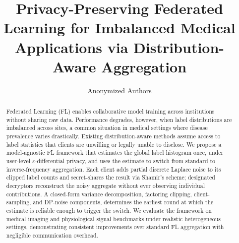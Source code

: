 \documentclass[runningheads]{llncs}
\begin{document}
%
\title{Privacy-Preserving Federated Learning for Imbalanced Medical Applications via Distribution-Aware Aggregation}
%

\author{Anonymized Authors}  %

\maketitle              %
%
\begin{abstract}
Federated Learning (FL) enables collaborative model training across institutions without sharing raw data.
Performance degrades, however, when label distributions are imbalanced across sites, a common situation in medical settings where disease prevalence varies drastically.
Existing distribution-aware methods assume access to label statistics that clients are unwilling or legally unable to disclose.
We propose a model-agnostic FL framework that estimates the global label histogram once, under user-level $\varepsilon$-differential privacy, and uses the estimate to switch from standard to inverse-frequency aggregation.
Each client adds partial discrete Laplace noise to its clipped label counts and secret-shares the result via Shamir's scheme; designated decryptors reconstruct the noisy aggregate without ever observing individual contributions.
A closed-form variance decomposition, factoring clipping, client-sampling, and DP-noise components, determines the earliest round at which the estimate is reliable enough to trigger the switch.
We evaluate the framework on medical imaging and physiological signal benchmarks under realistic heterogeneous settings, demonstrating consistent improvements over standard FL aggregation with negligible communication overhead.


\end{abstract}
%
%
%
\end{document}
